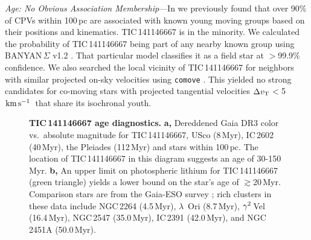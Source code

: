 \documentclass[11pt,twocolumn,tighten,linenumbers]{aastex7}
\newcommand{\kms}{\ensuremath{\rm km\,s^{-1}}}
\begin{document}
{\it Age: No Obvious Association Membership}---In
\citet{Bouma2024} we previously found that over 90\% of CPVs within
100\,pc are associated with
known young moving groups based on their positions and kinematics.
TIC\,141146667 is in the minority.  We calculated the probability of
TIC\,141146667 being part of any nearby known group using
BANYAN\,$\Sigma$ v1.2 \citep{Gagne2018}.  That particular model
classifies it as a field star at $>$99.9\% confidence.  We also
searched the local vicinity of TIC\,141146667 for neighbors with
similar projected on-sky velocities using \texttt{comove}
\citep{Tofflemire2021}.  This yielded no strong candidates for
co-moving stars with projected tangential velocities $\Delta v_{\rm
T}$$<$5\,\kms\ that share its isochronal youth.

\begin{figure}[!t]
	\begin{center}
	\end{center}
	\vspace{-0.3cm}
  \caption{{\bf TIC\,141146667 age diagnostics.}
  {\bf a,} Dereddened Gaia DR3 color vs.~absolute magnitude for
  TIC\,141146667, USco (8\,Myr), IC\,2602 (40\,Myr), the Pleiades
  (112\,Myr) and stars within 100\,pc. 
  The location of TIC\,141146667 in this diagram suggests an age of
  30-150\,Myr. 
  {\bf b,} An upper limit on photospheric lithium for TIC\,141146667
  (green triangle) yields a lower bound on the star's age of
  $\gtrsim$20\,Myr.  Comparison stars are from the Gaia-ESO survey
  \citep{Jeffries2023}; rich clusters in these data include NGC\,2264
  (4.5\,Myr), $\lambda$~Ori (8.7\,Myr), ${\rm \gamma}^2$\,Vel
  (16.4\,Myr), NGC\,2547 (35.0\,Myr), IC\,2391 (42.0\,Myr),
  and NGC\,2451A (50.0\,Myr). }
  \label{fig:age_diagnostics}
\end{figure}
\end{document}
